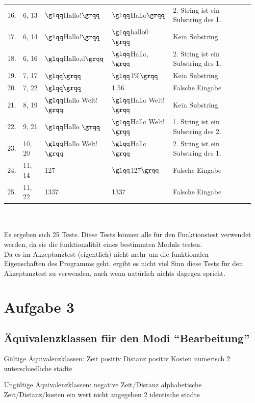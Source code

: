 \documentclass[a4paper]{report}
\begin{document}
\begin{tabular}{l|l|ll|l}
16.			& 6, 13				& $\glqq$Hallo!$\grqq$		& $\glqq$Hallo$\grqq$		& 2. String ist ein Substring des 1.\\
17.			& 6, 14				& $\glqq$Hallo!$\grqq$		& $\glqq$hallo0$\grqq$		& Kein Substring\\
18.			& 6, 16				& $\glqq$Hallo,d$\grqq$		& $\glqq$Hallo,$\grqq$		& 2. String ist ein Substring des 1.\\
19.			& 7, 17				& $\glqq \grqq$				& $\glqq$1\%$\grqq$			& Kein Substring\\
20.			& 7, 22				& $\glqq \grqq$				& 1.56						& Falsche Eingabe\\
21.			& 8, 19				& $\glqq$Hallo Welt!$\grqq$& $\glqq$Hallo Welt!$\grqq$& Kein Substring\\
22.			& 9, 21				& $\glqq$Hallo $\grqq$		& $\glqq$Hallo Welt!$\grqq$& 1. String ist ein Substring des 2.\\
23.			& 10, 20			& $\glqq$Hallo Welt!$\grqq$& $\glqq$Hallo $\grqq$		& 2. String ist ein Substring des 1.\\
24.			& 11, 14			& 127						& $\glqq$127$\grqq$			& Falsche Eingabe\\
25.			& 11, 22			& 1337						& 1337						& Falsche Eingabe\\
\end{tabular} \\ \\
Es ergeben sich 25 Tests. Diese Tests können alle für den Funktionstest verwendet werden, da sie die funktionalität eines bestimmten Moduls testen. \\
Da es im Akzeptanztest (eigentlich) nicht mehr um die funktionalen Eigenschaften des Programms geht, ergibt es nicht viel Sinn diese Tests für den Akzeptanztest zu verwenden, auch wenn natürlich nichts dagegen spricht.

\newpage
\section*{Aufgabe 3}
\subsection*{Äquivalenzklassen für den Modi ``Bearbeitung''}
Gültige Äquivalenzklassen:
Zeit positiv
Distanz positiv
Kosten numerisch
2 unterschiedliche städte


Ungültige Äquivalenzklassen:
negative Zeit/Distanz
alphabetische Zeit/Distanz/kosten
ein wert nicht angegeben
2 identische städte
\end{document}
